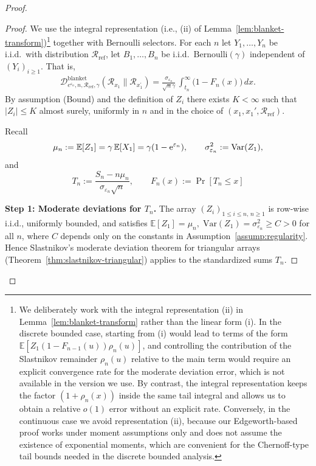 \documentclass{article}
\theoremstyle{plain}
\theoremstyle{definition}
\begin{document}
\begin{proof}
\begin{proof}
We use the integral representation (i.e., (ii) of Lemma~\ref{lem:blanket-transform})\footnote{We deliberately work with the integral representation (ii) in
Lemma~\ref{lem:blanket-transform} rather than the linear form (i).
In the discrete bounded case, starting from (i) would lead to terms of
the form $\mathbb{E}[Z_1(1-F_{n-1}(u))\rho_n (u)]$, and controlling the
contribution of the Slastnikov remainder $\rho_n (u)$ relative to the main term
would require an explicit convergence rate for the moderate deviation
error, which is not available in the version we use.  By contrast, the
integral representation keeps the factor $(1+\rho_n(x))$ inside the
same tail integral and allows us to obtain a relative $o(1)$ error
without an explicit rate.  Conversely, in the continuous case we avoid
representation (ii), because our Edgeworth-based proof works under
moment assumptions only and does not assume the existence of
exponential moments, which are convenient for the Chernoff-type tail
bounds needed in the discrete bounded analysis.} together with Bernoulli selectors.
For each $n$ let $Y_1,\dots,Y_n$ be i.i.d.\ with distribution
$\mathcal R_{\mathrm{ref}}$, let $B_1,\dots,B_n$ be i.i.d.\
$\mathrm{Bernoulli}(\gamma)$ independent of $(Y_i)_{i\ge1}$.
That is,
  \begin{equation}
    \label{eq:D-blanket-Tn}
    \begin{aligned}
    \mathcal D^{\mathrm{blanket}}_{e^{{\varepsilon_n}},n,\mathcal R_{\mathrm{ref}},\gamma}(
      \mathcal{R}_{x_1} \| \mathcal{R}_{x_1^\prime})
    = \frac{\sigma_{\varepsilon_n}}{\sqrt{n}\gamma}\,
       \int_{t_n}^\infty \bigl(1-F_n(x)\bigr)\,dx.
    \end{aligned}
  \end{equation}
By assumption (Bound) and the definition of $Z_i$ there exists $K<\infty$
such that $|Z_i|\le K$ almost surely, uniformly in $n$ and in the choice
of $(x_1,x_1',\mathcal R_{\mathrm{ref}})$.

Recall
\[
  \mu_n := \mathbb E[Z_1]
        = \gamma\,\mathbb E[X_1]
        = \gamma(1-{\rm e}^{\varepsilon_n}),
  \qquad
  \sigma_{\varepsilon_n}^2 := \mathrm{Var}(Z_1),
\]
and 
\[
  T_n
  := \frac{S_n-n\mu_n}{\sigma_{\varepsilon_n}\sqrt{n}},
  \qquad
  F_n(x) := \Pr\left[T_n\le x\right]
\]


\medskip\noindent
\textbf{Step 1: Moderate deviations for $T_n$.}
The array $(Z_i)_{1\le i\le n,\,n\ge1}$ is row-wise i.i.d., uniformly
bounded, and satisfies
\(
  \mathbb E[Z_1]=\mu_n,\;
  \mathrm{Var}(Z_1)=\sigma_{\varepsilon_n}^2\ge C>0
\)
for all $n$, where $C$ depends only on the constants in
Assumption~\ref{assump:regularity}. Hence Slastnikov's moderate
deviation theorem for triangular arrays
(Theorem~\ref{thm:slastnikov-triangular}) applies to the standardized
sums $T_n$.


\end{proof}
\end{proof}
\end{document}
